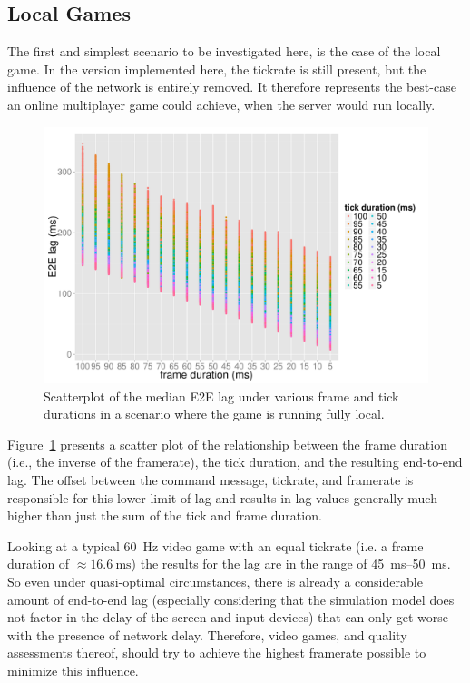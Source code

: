 \subsection{Local Games}

The first and simplest scenario to be investigated here, is the case of the local game. In the version implemented here, the tickrate is still present, but the influence of the network is entirely removed. It therefore represents the best-case an online multiplayer game could achieve, when the server would run locally.

\begin{figure}[!t]
	\centering
	\includegraphics[width=1.0\columnwidth]{../simulation/visualization/nwless-onlinegame-1000rounds.pdf}
	\caption{Scatterplot of the median E2E lag under various frame and tick durations in a scenario where the game is running fully local.}
\label{fig:nwless-scatter}
\end{figure}

Figure~\ref{fig:nwless-scatter} presents a scatter plot of the relationship between the frame duration (i.e., the inverse of the framerate), the tick duration, and the resulting end-to-end lag. The offset between the command message, tickrate, and framerate is responsible for this lower limit of lag and results in lag values generally much higher than just the sum of the tick and frame duration.

Looking at a typical \SI{60}{\hertz} video game with an equal tickrate (i.e. a frame duration of $\approx \SI{16.6}{\milli\second}$) the results for the lag are in the range of \SIrange{45}{50}{\milli\second}. So even under quasi-optimal circumstances, there is already a considerable amount of end-to-end lag (especially considering that the simulation model does not factor in the delay of the screen and input devices) that can only get worse with the presence of network delay. Therefore, video games, and quality assessments thereof, should try to achieve the highest framerate possible to minimize this influence.

